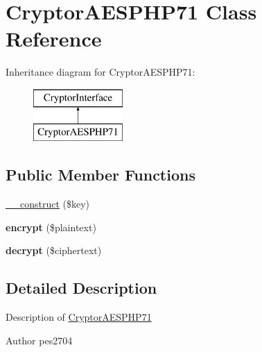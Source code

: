 \hypertarget{class_pes_1_1_security_1_1_cryptor_1_1_cryptor_a_e_s_p_h_p71}{}\section{Cryptor\+A\+E\+S\+P\+H\+P71 Class Reference}
\label{class_pes_1_1_security_1_1_cryptor_1_1_cryptor_a_e_s_p_h_p71}
Inheritance diagram for Cryptor\+A\+E\+S\+P\+H\+P71\+:\begin{figure}[H]
\begin{center}
\leavevmode
\includegraphics[height=2.000000cm]{class_pes_1_1_security_1_1_cryptor_1_1_cryptor_a_e_s_p_h_p71}
\end{center}
\end{figure}
\subsection*{Public Member Functions}
\begin{DoxyCompactItemize}
\item 
\mbox{\hyperlink{class_pes_1_1_security_1_1_cryptor_1_1_cryptor_a_e_s_p_h_p71_ae68e3281fdc4689e22a68b4b463c5fa9}{\+\_\+\+\_\+construct}} (\$key)
\item 
\mbox{\label{class_pes_1_1_security_1_1_cryptor_1_1_cryptor_a_e_s_p_h_p71_aa5ceadf7c30ea677b755c6085b23f2a5}} 
{\bfseries encrypt} (\$plaintext)
\item 
\mbox{\label{class_pes_1_1_security_1_1_cryptor_1_1_cryptor_a_e_s_p_h_p71_a7668d56408ddd5f0cd7e8e745afd9d9a}} 
{\bfseries decrypt} (\$ciphertext)
\end{DoxyCompactItemize}


\subsection{Detailed Description}
Description of \mbox{\hyperlink{class_pes_1_1_security_1_1_cryptor_1_1_cryptor_a_e_s_p_h_p71}{Cryptor\+A\+E\+S\+P\+H\+P71}}

\begin{DoxyAuthor}{Author}
pes2704 
\end{DoxyAuthor}


